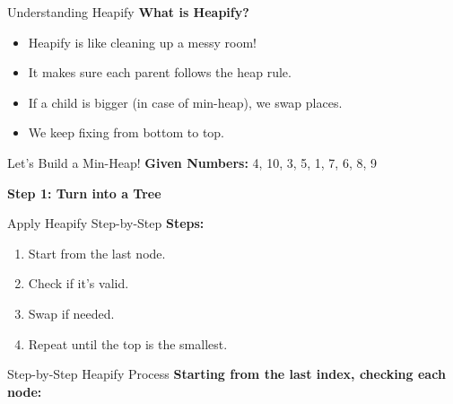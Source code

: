 \begin{frame}{Understanding Heapify}
\textbf{What is Heapify?}
\begin{itemize}
\item Heapify is like cleaning up a messy room!
\item It makes sure each parent follows the heap rule.
\item If a child is bigger (in case of min-heap), we swap places.
\item We keep fixing from bottom to top.
\end{itemize}
\end{frame}

\begin{frame}{Let’s Build a Min-Heap!}
\textbf{Given Numbers:} {4, 10, 3, 5, 1, 7, 6, 8, 9}

\textbf{Step 1: Turn into a Tree}
\begin{center}
\end{center}
\end{frame}

\begin{frame}{Apply Heapify Step-by-Step}
\textbf{Steps:}
\begin{enumerate}
\item Start from the last node.
\item Check if it's valid.
\item Swap if needed.
\item Repeat until the top is the smallest.
\end{enumerate}
\end{frame}
\begin{frame}{Step-by-Step Heapify Process}
\textbf{Starting from the last index, checking each node:}
\end{frame}

